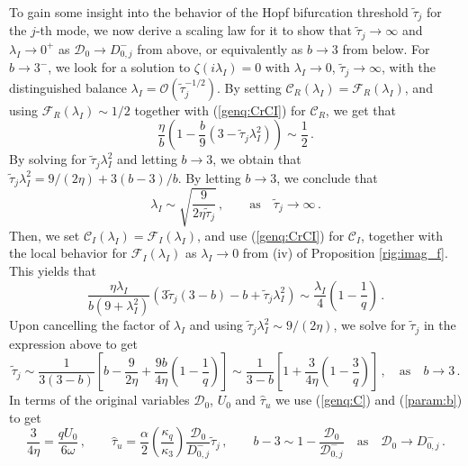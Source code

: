 \documentclass{article}%
\begin{document}
To gain some insight into the behavior of the Hopf bifurcation
threshold $\tilde{\tau}_{j}$ for the $j$-th mode, we now derive a
scaling law for it to show that $\tilde{\tau}_{j}\to
\infty$ and $\lambda_{I}\to 0^{+}$ as ${\mathcal D}_0\to D^{-}_{0,j}$
from above, or equivalently as $b\to 3$ from below.  For $b\to 3^{-}$,
we look for a solution to $\zeta(i\lambda_I)=0$ with $\lambda_I\to
0$, $\tilde{\tau}_j\to \infty$, with the distinguished balance
$\lambda_{I}={\mathcal O}(\tilde{\tau}_j^{-1/2})$.  By setting
${\mathcal C}_R(\lambda_I)={\mathcal F}_{R}(\lambda_I)$, and using
${\mathcal F}_{R}(\lambda_I)\sim {1/2}$ together with (\ref{genq:CrCI}) for
${\mathcal C}_R$, we get that
\begin{equation*}
    \frac{\eta}{b} \left(1 - \frac{b}{9} \left(3 - \tilde{\tau}_j \lambda_I^2
  \right)\right) \sim \frac{1}{2} \,.
\end{equation*}
By solving for $\tilde{\tau}_j\lambda_I^2$ and letting $b\to 3$, we obtain 
that $\tilde{\tau}_j\lambda_I^2 = 9/(2\eta) + {3(b-3)/b}$. By letting $b\to 3$,
we conclude that
\begin{equation}\label{genq:lami_asy}
    \lambda_I \sim \sqrt{ \frac{9}{2\eta\tilde{\tau}_j}}  
 \,, \qquad \mbox{as} \quad \tilde{\tau}_j \to \infty \,.
\end{equation}
Then, we set ${\mathcal C}_I(\lambda_I)={\mathcal F}_I(\lambda_I)$, and use
(\ref{genq:CrCI}) for ${\mathcal C}_I$, together with the local behavior 
for ${\mathcal F}_I(\lambda_I)$ as $\lambda_I\to 0$ from (iv) of 
Proposition \ref{rig:imag_f}. This yields that
\begin{equation*}
    \frac{\eta\lambda_I}{b(9+\lambda_I^2)} \left(3 \tilde{\tau}_j(3-b)-b
  + \tilde{\tau}_j \lambda_I^2\right) \sim \frac{\lambda_I}{4}\left(1 -
  \frac{1}{q}\right) \,.
\end{equation*}
Upon cancelling the factor of $\lambda_I$ and using 
$\tilde{\tau}_j\lambda_I^2\sim {9/(2\eta)}$, we solve for $\tilde{\tau}_j$
in the expression above to get
\begin{equation}\label{genq:shit_m}
   \tilde{\tau}_j \sim \frac{1}{3(3-b)} \left[ b - \frac{9}{2\eta} +
  \frac{9b}{4\eta}\left(1 - \frac{1}{q}\right) \right] \sim
 \frac{1}{3-b} \left[1 + \frac{3}{4\eta}
   \left(1- \frac{3}{q}\right) \right] \,, \quad \mbox{as} \quad b \to 3\,.
\end{equation}
In terms of the original variables ${\mathcal D}_0$, $U_0$ and
$\hat{\tau}_u$ we use (\ref{genq:C}) and (\ref{param:b}) to get
\begin{equation}\label{genq:form}
   \frac{3}{4\eta}=\frac{qU_0}{6\omega} \,, \qquad 
  \hat{\tau}_u = \frac{\alpha}{2} \left( \frac{\kappa_q}{\kappa_3}\right)
   \frac{{\mathcal D}_0}{D^{-}_{0,j}}  \tilde{\tau}_j \,, \qquad
   b-3 \sim 1- \frac{{\mathcal D}_0}{{\mathcal D}^{-}_{0,j}} 
  \quad \mbox{as} \quad  {\mathcal D}_0\to D^{-}_{0,j} \,.
\end{equation}
\end{document}
